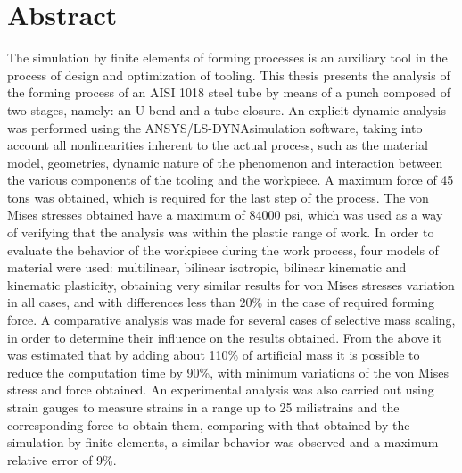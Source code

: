 \chapter*{Abstract}

The simulation by finite elements of forming processes is an auxiliary tool in the process of design and optimization of tooling. This thesis presents the analysis of the forming process of an AISI 1018 steel tube by means of a punch composed of two stages, namely: an U-bend and a tube closure. An explicit dynamic analysis was performed using the ANSYS/LS-DYNA\CR simulation software, taking into account all nonlinearities inherent to the actual process, such as the material model, geometries, dynamic nature of the phenomenon and interaction between the various components of the tooling and the workpiece. A maximum force of 45 tons was obtained, which is required for the last step of the process. The von Mises stresses obtained have a maximum of 84000 psi, which was used as a way of verifying that the analysis was within the plastic range of work. In order to evaluate the behavior of the workpiece during the work process, four models of material were used: multilinear, bilinear isotropic, bilinear kinematic and kinematic plasticity, obtaining very similar results for von Mises stresses variation in all cases, and with differences less than 20\% in the case of required forming force. A comparative analysis was made for several cases of selective mass scaling, in order to determine their influence on the results obtained. From the above it was estimated that by adding about 110\% of artificial mass it is possible to reduce the computation time by 90\%, with minimum variations of the von Mises stress and force obtained. An experimental analysis was also carried out using strain gauges to measure strains in a range up to 25 milistrains and the corresponding force to obtain them, comparing with that obtained by the simulation by finite elements, a similar behavior was observed and a maximum relative error of 9\%.